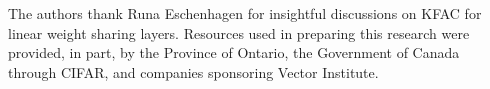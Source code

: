 \begin{ack} %
  The authors thank Runa Eschenhagen for insightful discussions on KFAC for linear weight sharing layers.
  Resources used in preparing this research were provided, in part, by the Province of Ontario, the Government of Canada through CIFAR, and companies sponsoring Vector Institute.
\end{ack}
